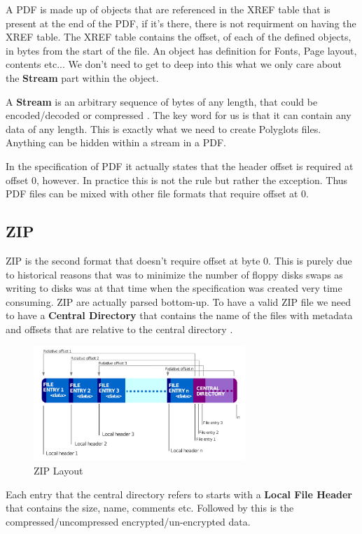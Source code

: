 A PDF is made up of objects that are referenced in the XREF table that is present at the end of the PDF, if it's there, there is not requirment on having
the XREF table. The XREF table contains the offset, of each of the defined objects, in bytes from the start of the file. An object
has definition for Fonts, Page layout, contents etc... We don't need to get to deep into this what we only care about the \textbf{Stream} part within the object.

A \textbf{Stream} is an arbitrary sequence of bytes of any length, that could be encoded/decoded or compressed \cite{PDF-Stream}. The key word for us is that it can
contain any data of any length. This is exactly what we need to create Polyglots files. Anything can be hidden within a stream in a PDF.

In the specification of PDF it actually states that the header offset is required at offset 0, however. In practice this is not the rule but rather the exception.
Thus PDF files can be mixed with other file formats that require offset at 0.

\subsection{ZIP}

ZIP is the second format that doesn't require offset at byte 0. This is purely due to historical reasons that was to minimize the number of floppy disks swaps as writing to disks
was at that time when the specification was created very time consuming. ZIP are actually parsed bottom-up. To have a valid ZIP file we need to have a \textbf{Central Directory}
that contains the name of the files with metadata and offsets that are relative to the central directory \cite{zip}.

\begin{figure}[h]
    \center
    \includegraphics[width=8cm]{images/zip.png}
    \caption{ZIP Layout\cite{zip}}
\end{figure}

Each entry that the central directory refers to starts with a \textbf{Local File Header} that contains the size, name, comments etc. Followed by this is the compressed/uncompressed encrypted/un-encrypted data.

